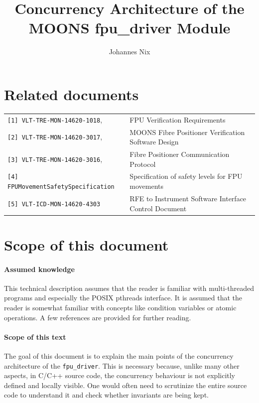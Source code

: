 \documentclass[fontsize=12,a4paper]{scrartcl}
\begin{document}
\title{Concurrency Architecture of the MOONS fpu\_driver Module}


\author{Johannes Nix}

\maketitle

\tableofcontents

\section{Related documents}

\begin{tabular}{|ll|}
  \hline
\verb+[1] VLT-TRE-MON-14620-1018+, &  FPU Verification Requirements \\
\verb+[2] VLT-TRE-MON-14620-3017+, & MOONS Fibre Positioner Verification Software Design \\
\verb+[3] VLT-TRE-MON-14620-3016+, & Fibre Positioner Communication Protocol\\
\verb+[4] FPUMovementSafetySpecification+ & Specification of safety levels for FPU movements\\
\verb+[5] VLT-ICD-MON-14620-4303+ & RFE to Instrument Software Interface Control Document \\
\hline
\end{tabular}


\section{Scope of this document}

\paragraph{Assumed knowledge} This technical description
assumes that the reader is familiar with multi-threaded programs and
especially the POSIX pthreads interface. It is assumed that the reader
is somewhat familiar with concepts like condition variables or atomic
operations.  A few references are provided for further reading.


\paragraph{Scope of this text} The goal of this document is to explain the main points of the
concurrency architecture of the \texttt{fpu\_driver}.  This is
necessary because, unlike many other aspects, in C/C++ source code,
the concurrency behaviour is not explicitly defined and locally
visible.  One would often need to scrutinize the entire source code to
understand it and check whether invariants are being kept.
\end{document}
